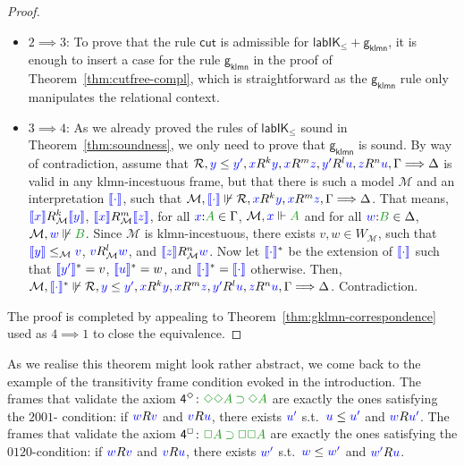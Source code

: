 \documentclass[a4paper]{article}
\theoremstyle{plain}
\theoremstyle{definition}
\newcommand*{\ax}[1]{\mathsf{#1}}
\newcommand*{\IK}{\mathsf{IK}}
\newcommand*{\labIKp}{\lab\IK_{\le}}
\newcommand*{\IMP}{\mathbin{\supset}}%
\newcommand*{\BOX}{\mathord{\Box}}
\newcommand*{\DIA}{\mathord{\Diamond}}
\newcommand{\B}{\mathcal{R}}
\newcommand{\Left}{\Gamma} %
\newcommand{\Right}{\Delta} %
\newcommand*{\fm}[1]{{\color{notgreen}{#1}}}
\newcommand*{\lb}[1]{{\color{blue}{#1}}}
\newcommand*{\rel}{R}
\newcommand*{\labels}[2]{\lb{#1}\mathord{:}\fm{#2}}
\newcommand*{\accs}[2]{\lb{#1}R\lb{#2}}
\newcommand*{\futs}[2]{\lb{#1}\le{\lb{#2}}}
\newcommand{\SEQ}{\Longrightarrow}
\newcommand*{\rn}[1]  {\ensuremath{\mathsf{#1}}}
\newcommand*{\lab}{\mathsf{lab}}
\newcommand{\gklmn}{{\mathsf{g_{klmn}}}}%
\newcommand{\M}{\mathcal{M}}
\newcommand{\inter}[1]{\lb{\llbracket #1\rrbracket}}
\newcommand{\nforce}[3]{#1,#2\not\Vdash#3}
\newcommand{\cforce}[3]{#1,\lb{#2}\Vdash\fm{#3}}
\newcommand{\cnforce}[3]{#1,\lb{#2}\not\Vdash\fm{#3}}
\begin{document}
\begin{proof}
\begin{itemize}
		\item $2 \implies 3$:
		To prove that the rule $\rn{cut}$ is admissible for $\labIKp + \gklmn$, it is enough to insert a case for the rule $\gklmn$ in the proof of Theorem~\ref{thm:cutfree-compl}, which
		is straightforward as the $\gklmn$ rule only manipulates the relational context.
		
		\item $3 \implies 4$:
		As we already proved the rules of $\labIKp$ sound in Theorem~\ref{thm:soundness}, we only need to prove that $\gklmn$ is sound.
		By way of contradiction, assume that $\B, \futs{y}{y'}, \lb x R^{k} \lb y, \lb x R^{m} \lb z, \lb{y'}R^{l} \lb u, \lb z R^{n} \lb u, \Left\SEQ\Right$ is valid in any klmn-incestuous frame,
		but that there is such a model $\M$ and an interpretation $\inter\cdot$, such
		that $\M,\inter\cdot\not\Vdash\B, \lb x R^{k} \lb y, \lb x R^{m} \lb z, \Left \SEQ \Right$.
		That means, $\inter x \rel_\M^k \inter y$, $\inter x \rel_\M^m\inter z$, for all $\labels{x}{A} \in \Left$, $\cforce \M xA$ and for all $\labels wB\in\Right$,
		$\cnforce \M wB$. 
		Since $\M$ is klmn-incestuous, there exists $v,w\in W_\M$, such that $\inter y \le_\M \lb{v}$, $\lb{v} R_\M^l \lb{w}$, and $\inter z R_\M^n \lb{w}$.
		Now let $\inter\cdot^*$ be the extension of $\inter\cdot$ such that $\inter{y'}^* = v$, $\inter{u}^* = w$, and $\inter\cdot^* = \inter\cdot$ otherwise.
		Then, $ \nforce \M {\inter\cdot^*} {\B, \futs{y}{y'}, \lb x R^{k} \lb y, \lb x R^{m} \lb z, \lb{y'}R^{l} \lb u, \lb z R^{n} \lb u, \Left\SEQ\Right}$. Contradiction.
	\end{itemize}
	
	The proof is completed by appealing to Theorem~\ref{thm:gklmn-correspondence} used as $4 \implies 1$ to close the equivalence.
\end{proof}

%

As we realise this theorem might look rather abstract, we come back to the example of the transitivity frame condition evoked in the introduction.
The frames that validate the axiom $\ax{4^{\DIA}} \colon \fm{\DIA\DIA A \IMP \DIA A}$ are exactly the ones satisfying the $2001$- condition: if $\accs wv$ and $\accs vu$, there exists $\lb{u'}$ s.t.~$\futs{u}{u'}$ and $\accs{w}{u'}$.
The frames that validate the axiom $\ax{4^{\BOX}} \colon \fm{\BOX A \IMP \BOX \BOX A}$ are exactly the ones satisfying the $0120$-condition: if $\accs wv$ and $\accs vu$, there exists $\lb{w'}$ s.t.~$\futs{w}{w'}$ and $\accs{w'}{u}$.
\end{document}
